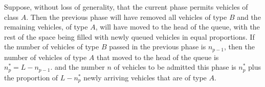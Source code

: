 \documentclass{amsart}
\begin{document}
Suppose, without loss of generality, that the current phase permits vehicles of
class $A$. Then the previous phase will have removed all vehicles of type $B$
and the remaining vehicles, of type $A$, will have moved to the head of the
queue, with the rest of the space being filled with newly queued vehicles in
equal proportions.
If the number of vehicles of type $B$ passed in the previous phase is $n_{p-1}$, then the number
of vehicles of type $A$ that moved to the head of the queue is $n_p^*=L-n_{p-1}$.
and the number $n$ of vehicles to be admitted this phase is $n_p^*$ plus the
proportion of $L - n_p^*$ newly arriving vehicles that are of type $A$.
\end{document}
